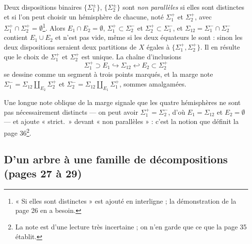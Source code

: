 \documentclass[11pt,a4paper]{article}
\begin{document}
Deux dispositions binaires $\{\Sigma_1^{\pm}\}$, $\{\Sigma_2^{\pm}\}$ sont
\emph{non parallèles} si elles sont distinctes et si l'on peut choisir un
hémisphère de chacune, noté $\Sigma_1^{+}$ et $\Sigma_2^{+}$, avec
$\Sigma_1^{+} \cap \Sigma_2^{+} = \emptyset$\footnote{« Si elles sont
distinctes » est ajouté en interligne ; la démonstration de la page 26 en a
besoin.}. Alors $E_1 \cap E_2 = \emptyset$, $\Sigma_1^{+} \subset
\Sigma_2^{-}$ et $\Sigma_2^{+} \subset \Sigma_1^{-}$, et $\Sigma_{12} =
\Sigma_1^{-} \cap \Sigma_2^{-}$ contient $E_1 \cup E_2$ et n'est pas vide,
même si les deux équateurs le sont : sinon les deux dispositions seraient
deux partitions de $X$ égales à $\{\Sigma_1^{+}, \Sigma_2^{+}\}$. Il en
résulte que le choix de $\Sigma_1^{+}$ et $\Sigma_2^{+}$ est unique. La
chaîne d'inclusions
\[
\Sigma_1^{+} \supset E_1 \hookrightarrow \Sigma_{12} \hookleftarrow E_2
\subset \Sigma_2^{+}
\]
se dessine comme un segment à trois points marqués, et la marge note
$\Sigma_1^{-} = \Sigma_{12} \amalg_{E_2} \Sigma_2^{+}$ et $\Sigma_2^{-} =
\Sigma_{12} \amalg_{E_1} \Sigma_1^{+}$, sommes amalgamées.

Une longue note oblique de la marge signale que les quatre hémisphères ne
sont pas nécessairement distincts --- on peut avoir $\Sigma_1^{+} =
\Sigma_2^{-}$, d'où $E_1 = \Sigma_{12}$ et $E_2 = \emptyset$ --- et ajoute
« strict.\ » devant « non parallèles » : c'est la notion que définit la
page 36\footnote{La note est d'une lecture très incertaine ; on n'en garde
que ce que la page 35 établit.}.

\subsection*{D'un arbre à une famille de décompositions (pages 27 à 29)}
\end{document}
